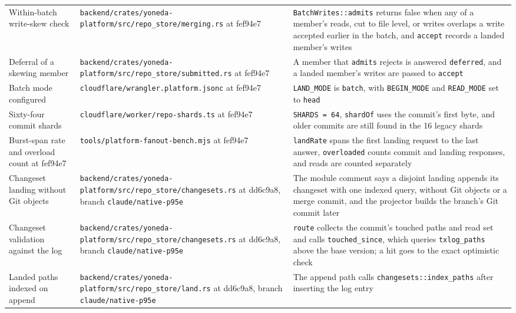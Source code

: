 \documentclass[11pt,letterpaper]{article}
\theoremstyle{definition}
\theoremstyle{remark}
\begin{document}
{\begin{longtable}{@{}L{3.0cm}L{5.3cm}L{7.2cm}@{}}
Within-batch write-skew check & \nolinkurl{backend/crates/yoneda-platform/src/repo_store/merging.rs} \newline at fef94e7 & \texttt{BatchWrites::admits} returns false when any of a member's reads, cut to file level, or writes overlaps a write accepted earlier in the batch, and \texttt{accept} records a landed member's writes \\
Deferral of a skewing member & \nolinkurl{backend/crates/yoneda-platform/src/repo_store/submitted.rs} \newline at fef94e7 & A member that \texttt{admits} rejects is answered \texttt{deferred}, and a landed member's writes are passed to \texttt{accept} \\
Batch mode configured & \nolinkurl{cloudflare/wrangler.platform.jsonc} \newline at fef94e7 & \texttt{LAND\_MODE} is \texttt{batch}, with \texttt{BEGIN\_MODE} and \texttt{READ\_MODE} set to \texttt{head} \\
Sixty-four commit shards & \nolinkurl{cloudflare/worker/repo-shards.ts} \newline at fef94e7 & \texttt{SHARDS = 64}, \texttt{shardOf} uses the commit's first byte, and older commits are still found in the 16 legacy shards \\
Burst-span rate and overload count at fef94e7 & \nolinkurl{tools/platform-fanout-bench.mjs} \newline at fef94e7 & \texttt{landRate} spans the first landing request to the last answer, \texttt{overloaded} counts commit and landing responses, and reads are counted separately \\
Changeset landing without Git objects & \nolinkurl{backend/crates/yoneda-platform/src/repo_store/changesets.rs} \newline at dd6c9a8, branch \nolinkurl{claude/native-p95e} & The module comment says a disjoint landing appends its changeset with one indexed query, without Git objects or a merge commit, and the projector builds the branch's Git commit later \\
Changeset validation against the log & \nolinkurl{backend/crates/yoneda-platform/src/repo_store/changesets.rs} \newline at dd6c9a8, branch \nolinkurl{claude/native-p95e} & \texttt{route} collects the commit's touched paths and read set and calls \texttt{touched\_since}, which queries \texttt{txlog\_paths} above the base version; a hit goes to the exact optimistic check \\
Landed paths indexed on append & \nolinkurl{backend/crates/yoneda-platform/src/repo_store/land.rs} \newline at dd6c9a8, branch \nolinkurl{claude/native-p95e} & The append path calls \texttt{changesets::index\_paths} after inserting the log entry \\

\end{longtable}}
\end{document}
